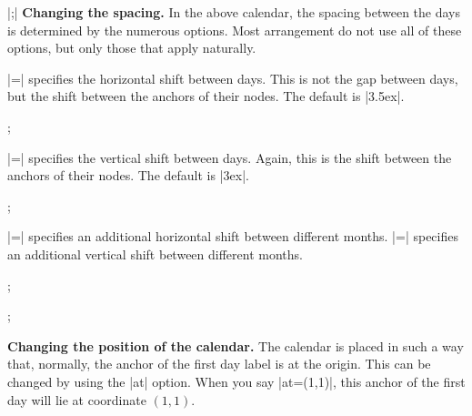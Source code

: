 \begin{command}{\calendar {}|;|}
  \medskip
  \textbf{Changing the spacing.}
  In the above calendar, the spacing between the days is determined by
  the numerous options. Most arrangement do not use all of these
  options, but only those that apply naturally.
  \begin{itemize}
    |=| specifies the
    horizontal shift between days. This is not the gap between days,
    but the shift between the anchors of their nodes. The default is
    |3.5ex|. 
\begin{codeexample}[]
\tikz \calendar[dates=2000-01-01 to 2000-01-31,week list,day xshift=3ex];  
\end{codeexample}
    |=| specifies the
    vertical shift between days. Again, this is the shift between the
    anchors of their nodes. The default is |3ex|. 
\begin{codeexample}[]
\tikz \calendar[dates=2000-01-01 to 2000-01-31,week list,day yshift=2ex];  
\end{codeexample}
    |=| specifies an
    additional  horizontal shift between different months.
    |=| specifies an
    additional  vertical shift between different months. 
\begin{codeexample}[]
\tikz \calendar[dates=2000-01-01 to 2000-02-last,week list,
                month yshift=0pt];  
\end{codeexample}
\begin{codeexample}[]
\tikz \calendar[dates=2000-01-01 to 2000-02-last,week list,
                month yshift=1cm];  
\end{codeexample}
  \end{itemize}

  \medskip
  \textbf{Changing the position of the calendar.}
  The calendar is placed in such a way that, normally, the anchor of
  the first day label is at the origin. This can be changed by using
  the |at| option. When you say |at={(1,1)}|, this anchor of the first
  day will lie at coordinate $(1,1)$.


\end{command}
